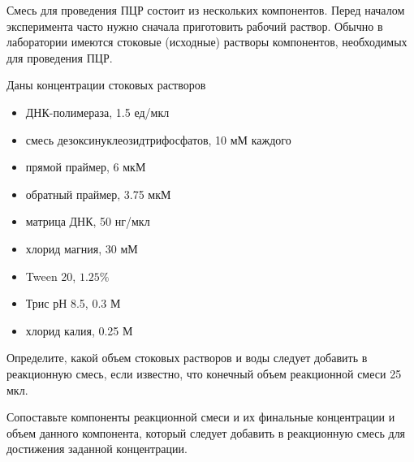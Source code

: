 
Смесь для проведения ПЦР состоит из нескольких компонентов. Перед началом эксперимента часто нужно сначала приготовить рабочий раствор. Обычно в лаборатории имеются стоковые (исходные) растворы компонентов, необходимых для проведения ПЦР.

Даны концентрации стоковых растворов

\begin{itemize}
    \item ДНК-полимераза, 1.5 ед/мкл
    \item смесь дезоксинуклеозидтрифосфатов, 10 мМ каждого
    \item прямой праймер, 6 мкМ
    \item обратный праймер, 3.75 мкМ
    \item матрица ДНК, 50 нг/мкл
    \item хлорид магния, 30 мМ
    \item Tween 20, $1.25\%$
    \item Трис рН 8.5, 0.3 М
    \item хлорид калия, 0.25 М
\end{itemize}

Определите, какой объем стоковых растворов и воды следует добавить в реакционную смесь, если известно, что конечный объем реакционной смеси 25 мкл.

Сопоставьте компоненты реакционной смеси и их финальные концентрации и объем данного компонента, который следует добавить в реакционную смесь для достижения заданной концентрации.

